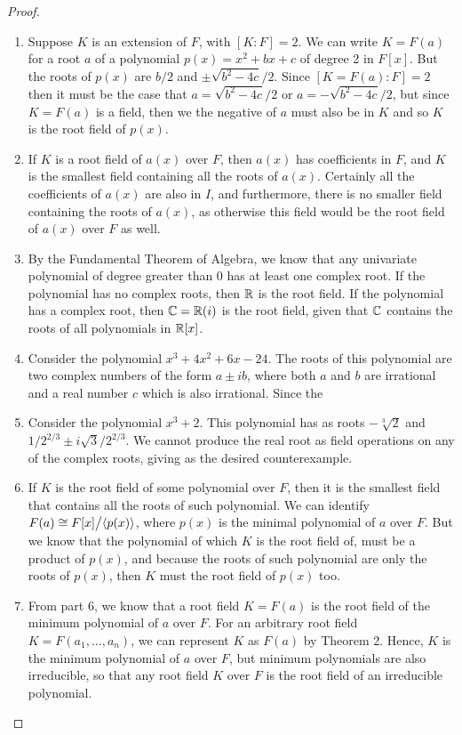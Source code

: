 \begin{proof}
 \begin{enumerate}
     \item Suppose $K$ is an extension of $F$, with $[K:F]=2$. We can write $K=F(a)$ for a root $a$ of a polynomial $p(x)=x^2+bx+c$ of degree 2 in $F[x]$. But the roots of $p(x)$ are $b/2$ and $\pm\sqrt{b^2-4c}/2$. Since $[K=F(a):F]=2$ then it must be the case that $a=\sqrt{b^2-4c}/2$ or $a=-\sqrt{b^2-4c}/2$, but since $K=F(a)$ is a field, then we the negative of $a$ must also be in $K$ and so $K$ is the root field of $p(x)$.
    \item If $K$ is a root field of $a(x)$ over $F$, then $a(x)$ has coefficients in $F$, and $K$ is the smallest field containing all the roots of $a(x)$. Certainly all the coefficients of $a(x)$ are also in $I$, and furthermore, there is no smaller field containing the roots of $a(x)$, as otherwise this field would be the root field of $a(x)$ over $F$ as well.
    \item By the Fundamental Theorem of Algebra, we know that any univariate polynomial of degree greater than 0 has at least one complex root. If the polynomial has no complex roots, then $\mathbb{R}$ is the root field. If the polynomial has a complex root, then $\mathbb{C}=\mathbb{R}(i)$ is the root field, given that $\mathbb{C}$ contains the roots of all polynomials in $\mathbb{R}[x]$.
    \item Consider the polynomial $x^3+4x^2+6x-24$. The roots of this polynomial are two complex numbers of the form $a\pm ib$, where both $a$ and $b$ are irrational and a real number $c$ which is also irrational. Since the 
    \item Consider the polynomial $x^3+2$. This polynomial has as roots $-\sqrt[3]{2}$ and $1/2^{2/3}\pm i\sqrt{3}/2^{2/3}$. We cannot produce the real root as field operations on any of the complex roots, giving as the desired counterexample.
    \item If $K$ is the root field of some polynomial over $F$, then it is the smallest field that contains all the roots of such polynomial. We can identify $F(a)\cong{\textstyle F[x]}\big/{\textstyle \langle p(x)\rangle}$, where $p(x)$ is the minimal polynomial of $a$ over $F$. But we know that the polynomial of which $K$ is the root field of, must be a product of $p(x)$, and because the roots of such polynomial are only the roots of $p(x)$, then $K$ must the root field of $p(x)$ too.
    \item From part 6, we know that a root field $K=F(a)$ is the root field of the minimum polynomial of $a$ over $F$. For an arbitrary root field $K=F(a_1,\dots,a_n)$, we can represent $K$ as $F(a)$ by Theorem 2. Hence, $K$ is the minimum polynomial of $a$ over $F$, but minimum polynomials are also irreducible, so that any root field $K$ over $F$ is the root field of an irreducible polynomial.

\end{enumerate}
\end{proof}
